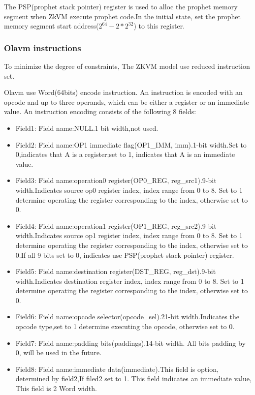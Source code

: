 The PSP(prophet stack pointer) register is used to alloc the prophet memory segment when ZkVM execute prophet code.In the initial state, set the prophet memory segment start address($2^{64} - 2*2^{32}$) to this register.

\subsubsection{Olavm instructions}\label{subsec: zkvm-executor-instructions}
To minimize the degree of constraints, The ZKVM model use reduced instruction set.

Olavm use Word(64bits) encode instruction.
An instruction is encoded with an opcode and up to three operands, which can be either a register or an immediate value.
An instruction encoding consists of the following 8 fields:
\begin{itemize}
    \item Field1: Field name:NULL.1 bit width,not used.
    \item Field2: Field name:OP1 immediate flag(OP1\_IMM, imm).1-bit width.Set to 0,indicates that A is a register;set to 1, indicates that A is an immediate value.
    \item Field3: Field name:operation0 register(OP0\_REG, reg\_src1).9-bit width.Indicates source op0 register index, index range from 0 to 8.
                  Set to 1 determine operating the register corresponding to the index, otherwise set to 0.
    \item Field4: Field name:operation1 register(OP1\_REG, reg\_src2).9-bit width.Indicates source op1 register index, index range from 0 to 8.
                  Set to 1 determine operating the register corresponding to the index, otherwise set to 0.If all 9 bits set to 0, indicates use PSP(prophet stack pointer) register.
    \item Field5: Field name:destination register(DST\_REG, reg\_dst).9-bit width.Indicates destination register index, index range from 0 to 8.
                  Set to 1 determine operating the register corresponding to the index, otherwise set to 0.
    \item Field6: Field name:opcode selector(opcode\_sel).21-bit width.Indicates the opcode type,set to 1 determine executing the opcode, otherwise set to 0.
    \item Field7: Field name:padding bits(paddings).14-bit width.
                  All bits padding by 0, will be used in the future.
    \item Field8: Field name:immediate data(immediate).This field is option, determined by field2,If filed2 set to 1.
                  This field indicates an immediate value, This field is 2 Word width.
\end{itemize}

